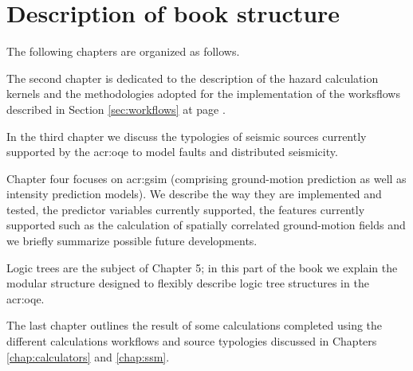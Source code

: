 \section{Description of book structure}
The following chapters are organized as follows. 

The second chapter is dedicated to the description of the hazard calculation
kernels and the methodologies adopted for the implementation of the worksflows
described in Section \ref{sec:workflows} at page \pageref{sec:workflows}. 

In the third chapter we discuss the typologies of seismic sources currently
supported by the \gls{acr:oqe} to model faults and distributed seismicity.

Chapter four focuses on \gls{acr:gsim} (comprising ground-motion prediction as
well as intensity prediction models). We describe the way they are implemented
and tested, the predictor variables currently supported, the features currently
supported such as the calculation of spatially correlated ground-motion fields
and we briefly summarize possible future developments.
 
Logic trees are the subject of Chapter 5; in this part of the book we explain
the modular structure designed to flexibly describe logic tree structures in the
\gls{acr:oqe}. 
 
The last chapter outlines the result of some calculations completed using the
different calculations workflows and source typologies discussed in Chapters
\ref{chap:calculators} and \ref{chap:ssm}.
